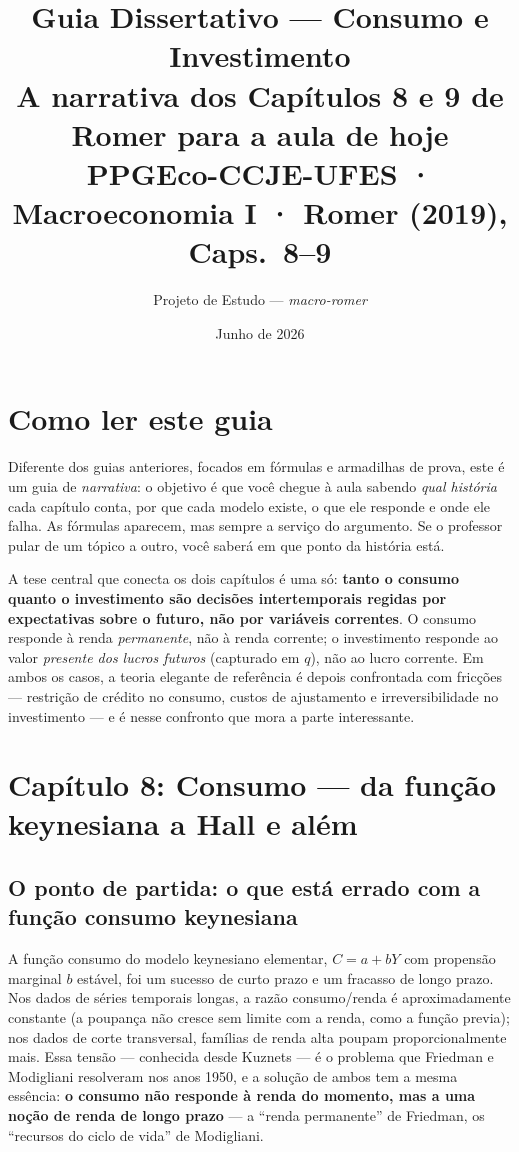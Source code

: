 \documentclass[11pt,a4paper]{article}
\title{\textbf{Guia Dissertativo --- Consumo e Investimento}\\[4pt]
       {\large A narrativa dos Capítulos 8 e 9 de Romer para a aula de hoje}\\[2pt]
       {\normalsize PPGEco-CCJE-UFES · Macroeconomia I · Romer (2019), Caps.\ 8--9}}
\author{Projeto de Estudo --- \textit{macro-romer}}
\date{Junho de 2026}
\newcommand{\ideia}[1]{\textcolor{destaque}{\textbf{#1}}}
\begin{document}
\maketitle

\section*{Como ler este guia}

Diferente dos guias anteriores, focados em fórmulas e armadilhas de prova,
este é um guia de \emph{narrativa}: o objetivo é que você chegue à aula
sabendo \emph{qual história} cada capítulo conta, por que cada modelo
existe, o que ele responde e onde ele falha. As fórmulas aparecem, mas
sempre a serviço do argumento. Se o professor pular de um tópico a outro,
você saberá em que ponto da história está.

A tese central que conecta os dois capítulos é uma só: \ideia{tanto o
consumo quanto o investimento são decisões intertemporais regidas por
expectativas sobre o futuro, não por variáveis correntes}. O consumo
responde à renda \emph{permanente}, não à renda corrente; o investimento
responde ao valor \emph{presente dos lucros futuros} (capturado em $q$),
não ao lucro corrente. Em ambos os casos, a teoria elegante de referência
é depois confrontada com fricções --- restrição de crédito no consumo,
custos de ajustamento e irreversibilidade no investimento --- e é nesse
confronto que mora a parte interessante.

\section{Capítulo 8: Consumo --- da função keynesiana a Hall e além}

\subsection{O ponto de partida: o que está errado com a função consumo keynesiana}

A função consumo do modelo keynesiano elementar, $C = a + bY$ com
propensão marginal $b$ estável, foi um sucesso de curto prazo e um
fracasso de longo prazo. Nos dados de séries temporais longas, a razão
consumo/renda é aproximadamente constante (a poupança não cresce sem
limite com a renda, como a função previa); nos dados de corte transversal,
famílias de renda alta poupam proporcionalmente mais. Essa tensão ---
conhecida desde Kuznets --- é o problema que Friedman e Modigliani
resolveram nos anos 1950, e a solução de ambos tem a mesma essência:
\ideia{o consumo não responde à renda do momento, mas a uma noção de
renda de longo prazo} --- a ``renda permanente'' de Friedman, os
``recursos do ciclo de vida'' de Modigliani.
\end{document}
